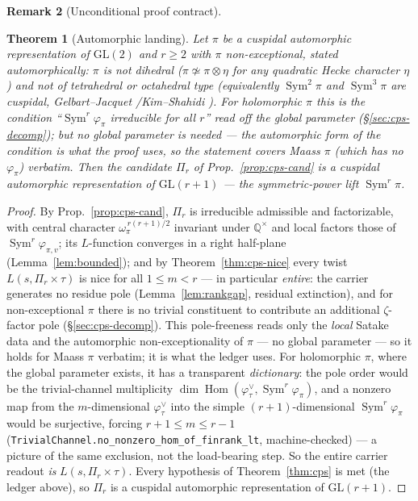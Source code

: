 \documentclass[11pt]{article}
\newtheorem{theorem}{Theorem}
\theoremstyle{definition}
\newtheorem{remark}[theorem]{Remark}
\newcommand{\Sym}{\operatorname{Sym}}
\begin{document}
\begin{remark}[Unconditional proof contract]
\begin{enumerate}
\begin{theorem}[Automorphic landing]\label{thm:func}
Let $\pi$ be a cuspidal automorphic representation of $\mathrm{GL}(2)$ and $r\ge2$ with $\pi$
\emph{non-exceptional}, stated automorphically: $\pi$ is not dihedral ($\pi\not\simeq\pi\otimes\eta$ for any
quadratic Hecke character $\eta$) and not of tetrahedral or octahedral type (equivalently $\Sym^2\pi$ and
$\Sym^3\pi$ are cuspidal, Gelbart--Jacquet \cite{GJ}/Kim--Shahidi \cite{KimShahidi}). For holomorphic $\pi$ this
is the condition ``$\Sym^r\varphi_\pi$ irreducible for all $r$'' read off the global parameter
(\S\ref{sec:cps-decomp}); but no global parameter is needed --- the automorphic form of the condition is what the
proof uses, so the statement covers Maass $\pi$ (which has no $\varphi_\pi$) verbatim. Then the candidate $\Pi_r$
of Prop.~\ref{prop:cps-cand} is a \emph{cuspidal automorphic} representation of $\mathrm{GL}(r+1)$ --- the
symmetric-power lift $\Sym^r\pi$.
\end{theorem}
\begin{proof}
By Prop.~\ref{prop:cps-cand}, $\Pi_r$ is irreducible admissible and factorizable, with central character
$\omega_\pi^{\,r(r+1)/2}$ invariant under $\mathbb Q^\times$ and local factors those of $\Sym^r\varphi_{\pi,v}$;
its $L$-function converges in a right half-plane (Lemma~\ref{lem:bounded}); and by Theorem~\ref{thm:cps-nice}
every twist $L(s,\Pi_r\times\tau)$ is nice for all $1\le m<r$ --- in particular \emph{entire}: the carrier
generates no residue pole (Lemma~\ref{lem:rankgap}, residual extinction), and for non-exceptional $\pi$ there is
no trivial constituent to contribute an additional $\zeta$-factor pole (\S\ref{sec:cps-decomp}). This
pole-freeness reads only the \emph{local} Satake data and the automorphic non-exceptionality of $\pi$ --- no
global parameter --- so it holds for Maass $\pi$ verbatim; it is what the ledger uses. For holomorphic $\pi$,
where the global parameter exists, it has a transparent \emph{dictionary}: the pole order would be the
trivial-channel multiplicity $\dim\operatorname{Hom}(\varphi_\tau^\vee,\Sym^r\varphi_\pi)$, and a nonzero map from
the $m$-dimensional $\varphi_\tau^\vee$ into the simple $(r+1)$-dimensional $\Sym^r\varphi_\pi$ would be
surjective, forcing $r+1\le m\le r-1$ (\texttt{TrivialChannel.no\_nonzero\_hom\_of\_finrank\_lt}, machine-checked)
--- a picture of the same exclusion, not the load-bearing step. So the entire carrier readout \emph{is}
$L(s,\Pi_r\times\tau)$. Every hypothesis of Theorem~\ref{thm:cps} is met (the ledger above), so $\Pi_r$ is a
cuspidal automorphic representation of $\mathrm{GL}(r+1)$.
\end{proof}


\end{enumerate}
\end{remark}
\end{document}
